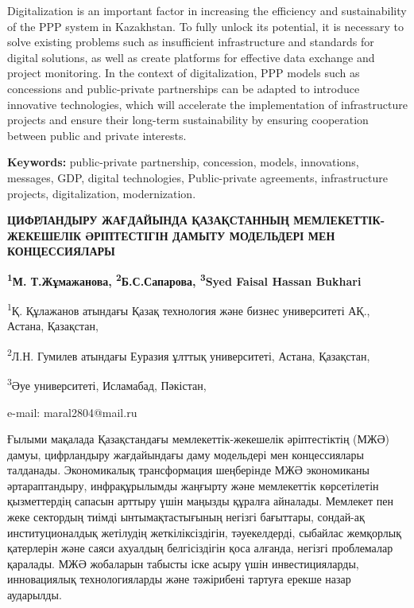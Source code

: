 Digitalization is an important factor in increasing the efficiency and
sustainability of the PPP system in Kazakhstan. To fully unlock its
potential, it is necessary to solve existing problems such as
insufficient infrastructure and standards for digital solutions, as well
as create platforms for effective data exchange and project monitoring.
In the context of digitalization, PPP models such as concessions and
public-private partnerships can be adapted to introduce innovative
technologies, which will accelerate the implementation of infrastructure
projects and ensure their long-term sustainability by ensuring
cooperation between public and private interests.

{\bfseries Keywords:} public-private partnership, concession, models,
innovations, messages, GDP, digital techno\-logies, Public-private
agreements, infrastructure projects, digitalization, modernization.

\begin{articleheader}
{\bfseries ЦИФРЛАНДЫРУ ЖАҒДАЙЫНДА ҚАЗАҚСТАННЫҢ МЕМЛЕКЕТТІК-ЖЕКЕШЕЛІК ӘРІПТЕСТІГІН ДАМЫТУ МОДЕЛЬДЕРІ МЕН КОНЦЕССИЯЛАРЫ}

{\bfseries
\textsuperscript{1}М. Т.Жұмажанова\textsuperscript{\envelope },
\textsuperscript{2}Б.С.Сапарова,
\textsuperscript{3}Syed Faisal Hassan Bukhari
}
\end{articleheader}

\begin{affiliation}
\textsuperscript{1}Қ. Құлажанов атындағы Қазақ технология және бизнес университеті АҚ., Астана, Қазақстан,

\textsuperscript{2}Л.Н. Гумилев атындағы Еуразия ұлттық университеті, Астана, Қазақстан,

\textsuperscript{3}Әуе университеті, Исламабад, Пәкістан,

e-mail: maral2804@mail.ru
\end{affiliation}

Ғылыми мақалада Қазақстандағы мемлекеттік-жекешелік әріптестіктің (МЖӘ)
дамуы, цифрландыру жағдайындағы даму модельдері мен концессиялары
талданады. Экономикалық трансформация шеңберінде МЖӘ экономиканы
әртараптандыру, инфрақұрылымды жаңғырту және мемлекеттік көрсетілетін
қызметтердің сапасын арттыру үшін маңызды құралға айналады. Мемлекет пен
жеке сектордың тиімді ынтымақтастығының негізгі бағыттары, сондай-ақ
институционалдық жетілудің жеткіліксіздігін, тәуекелдерді, сыбайлас
жемқорлық қатерлерін және саяси ахуалдың белгісіздігін қоса алғанда,
негізгі проблемалар қаралады. МЖӘ жобаларын табысты іске асыру үшін
инвестицияларды, инновациялық технологияларды және тәжірибені тартуға
ерекше назар аударылды.

